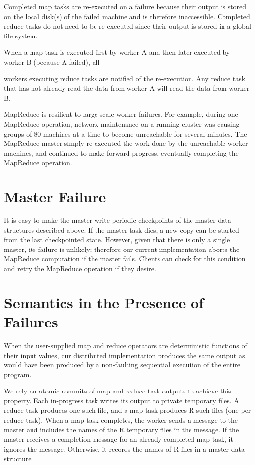 \documentclass[
]{article}
\begin{document}
Completed map tasks are re-executed on a failure because their output is
stored on the local disk(s) of the failed machine and is therefore
inaccessible. Completed reduce tasks do not need to be re-executed since
their output is stored in a global file system.

When a map task is executed first by worker A and then later executed by
worker B (because A failed), all

workers executing reduce tasks are notified of the re-execution. Any
reduce task that has not already read the data from worker A will read
the data from worker B.

MapReduce is resilient to large-scale worker failures. For example,
during one MapReduce operation, network maintenance on a running cluster
was causing groups of 80 machines at a time to become unreachable for
several minutes. The MapReduce master simply re-executed the work done
by the unreachable worker machines, and continued to make forward
progress, eventually completing the MapReduce operation.

\section{Master Failure}\label{master-failure}

It is easy to make the master write periodic checkpoints of the master
data structures described above. If the master task dies, a new copy can
be started from the last checkpointed state. However, given that there
is only a single master, its failure is unlikely; therefore our current
implementation aborts the MapReduce computation if the master fails.
Clients can check for this condition and retry the MapReduce operation
if they desire.

\section{Semantics in the Presence of
Failures}\label{semantics-in-the-presence-of-failures}

When the user-supplied map and reduce operators are deterministic
functions of their input values, our distributed implementation produces
the same output as would have been produced by a non-faulting sequential
execution of the entire program.

We rely on atomic commits of map and reduce task outputs to achieve this
property. Each in-progress task writes its output to private temporary
files. A reduce task produces one such file, and a map task produces R
such files (one per reduce task). When a map task completes, the worker
sends a message to the master and includes the names of the R temporary
files in the message. If the master receives a completion message for an
already completed map task, it ignores the message. Otherwise, it
records the names of R files in a master data structure.
\end{document}
